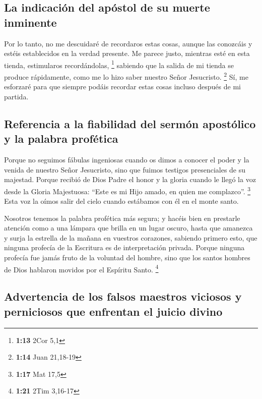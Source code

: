 \hypertarget{la-indicaciuxf3n-del-apuxf3stol-de-su-muerte-inminente}{%
\subsection{La indicación del apóstol de su muerte
inminente}\label{la-indicaciuxf3n-del-apuxf3stol-de-su-muerte-inminente}}

 Por lo tanto, no me descuidaré de recordaros estas
cosas, aunque las conozcáis y estéis establecidos en la verdad presente.
 Me parece justo, mientras esté en esta tienda,
estimularos recordándolas, \footnote{\textbf{1:13} 2Cor 5,1}
 sabiendo que la salida de mi tienda se produce
rápidamente, como me lo hizo saber nuestro Señor Jesucristo. \footnote{\textbf{1:14}
  Juan 21,18-19}  Sí, me esforzaré para que siempre
podáis recordar estas cosas incluso después de mi partida.

\hypertarget{referencia-a-la-fiabilidad-del-sermuxf3n-apostuxf3lico-y-la-palabra-profuxe9tica}{%
\subsection{Referencia a la fiabilidad del sermón apostólico y la
palabra
profética}\label{referencia-a-la-fiabilidad-del-sermuxf3n-apostuxf3lico-y-la-palabra-profuxe9tica}}

 Porque no seguimos fábulas ingeniosas cuando os dimos a
conocer el poder y la venida de nuestro Señor Jesucristo, sino que
fuimos testigos presenciales de su majestad.  Porque
recibió de Dios Padre el honor y la gloria cuando le llegó la voz desde
la Gloria Majestuosa: ``Este es mi Hijo amado, en quien me complazco''.
\footnote{\textbf{1:17} Mat 17,5}  Esta voz la oímos
salir del cielo cuando estábamos con él en el monte santo.

 Nosotros tenemos la palabra profética más segura; y
hacéis bien en prestarle atención como a una lámpara que brilla en un
lugar oscuro, hasta que amanezca y surja la estrella de la mañana en
vuestros corazones,  sabiendo primero esto, que ninguna
profecía de la Escritura es de interpretación privada. 
Porque ninguna profecía fue jamás fruto de la voluntad del hombre, sino
que los santos hombres de Dios hablaron movidos por el Espíritu Santo.
\footnote{\textbf{1:21} 2Tim 3,16-17}

\hypertarget{advertencia-de-los-falsos-maestros-viciosos-y-perniciosos-que-enfrentan-el-juicio-divino}{%
\subsection{Advertencia de los falsos maestros viciosos y perniciosos
que enfrentan el juicio
divino}\label{advertencia-de-los-falsos-maestros-viciosos-y-perniciosos-que-enfrentan-el-juicio-divino}}

